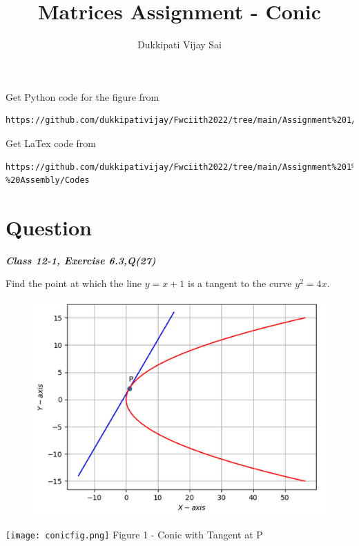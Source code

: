 \documentclass[journal,12pt,twocolumn]{IEEEtran}
\begin{document}
\makeatother
\let\StandardTheFigure\thefigure
\let\vec\mathbf
\renewcommand{\thefigure}{\theproblem}
\def\putbox#1#2#3{\makebox[0in][l]{\makebox[#1][l]{}\raisebox{\baselineskip}[0in][0in]{\raisebox{#2}[0in][0in]{#3}}}}
     \def\rightbox#1{\makebox[0in][r]{#1}}
     \def\centbox#1{\makebox[0in]{#1}}
     \def\topbox#1{\raisebox{-\baselineskip}[0in][0in]{#1}}
     \def\midbox#1{\raisebox{-0.5\baselineskip}[0in][0in]{#1}}
\vspace{3cm}
\title{\textbf{Matrices Assignment - Conic} }
\author{Dukkipati Vijay Sai}
\maketitle
\newpage
\bigskip
\renewcommand{\thefigure}{\theenumi}
\renewcommand{\thetable}{\theenumi}
Get Python code for the figure from 
\begin{lstlisting}
https://github.com/dukkipativijay/Fwciith2022/tree/main/Assignment%201/Codes/src
\end{lstlisting}
Get LaTex code from
\begin{lstlisting}
https://github.com/dukkipativijay/Fwciith2022/tree/main/Assignment%201%20-%20Assembly/Codes
\end{lstlisting}
%
\section{Question}
\centering
\textbf{\textit{Class 12-1, Exercise 6.3,Q(27)}}\\
\vspace{0.25cm}
\raggedright
\fi
Find the point at which the line $y = x + 1$ is a tangent to the curve $y^2 = 4x$.
\\
\solution 
	\begin{figure}[!h]
		\centering
 \includegraphics[width=\columnwidth]{chapters/12/6/3/27/figs/conicfig.png}
		\caption{}
		\label{fig:12/6/3/27}
  	\end{figure}
	\iffalse
\centering
\vspace{0.25cm}
\texttt{[image: conicfig.png]}
Figure 1 - Conic with Tangent at P
\end{document}
